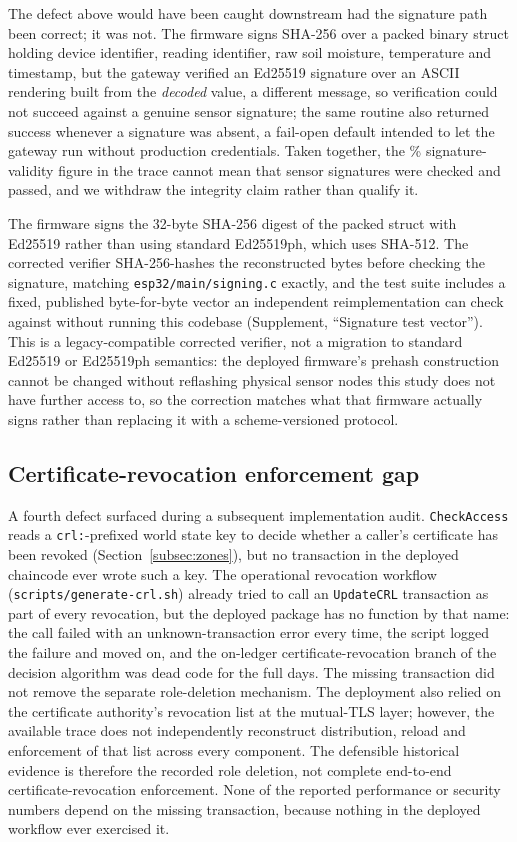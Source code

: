 \documentclass[a4paper,fleqn]{cas-sc}
\begin{document}
The defect above would have been caught downstream had the signature path
been correct; it was not. The firmware signs SHA-256 over a packed binary
struct holding device identifier, reading identifier, raw soil moisture,
temperature and timestamp, but the gateway verified an Ed25519 signature
over an ASCII rendering built from the \emph{decoded} value, a different
message, so verification could not succeed against a genuine sensor
signature; the same routine also returned success whenever a signature
was absent, a fail-open default intended to let the gateway run without
production credentials. Taken together, the \SigValidPct\%
signature-validity figure in the trace cannot mean that sensor signatures
were checked and passed, and we withdraw the integrity claim rather than
qualify it.

The firmware signs the 32-byte SHA-256 digest of the packed struct with
Ed25519 rather than using standard Ed25519ph, which uses SHA-512.
The corrected verifier SHA-256-hashes the reconstructed bytes
before checking the signature, matching \texttt{esp32/main/signing.c}
exactly, and the test suite includes a fixed, published byte-for-byte
vector an independent reimplementation can check against without running
this codebase (Supplement, ``Signature test vector''). This is a
legacy-compatible corrected verifier, not a migration to standard
Ed25519 or Ed25519ph semantics: the deployed firmware's prehash
construction cannot be changed without reflashing physical sensor nodes
this study does not have further access to, so the correction matches
what that firmware actually signs rather than replacing it with a
scheme-versioned protocol.

\subsection{Certificate-revocation enforcement gap}
\label{subsec:pm_crl}

A fourth defect surfaced during a subsequent implementation audit. \texttt{CheckAccess} reads a \texttt{crl:}-prefixed world
state key to decide whether a caller's certificate has been revoked
(Section~\ref{subsec:zones}), but no transaction in the deployed chaincode
ever wrote such a key. The operational revocation workflow
(\texttt{scripts/generate-crl.sh}) already tried to call an
\texttt{UpdateCRL} transaction as part of every revocation, but the
deployed package has no function by that name: the call failed with an
unknown-transaction error every time, the script logged the failure and
moved on, and the on-ledger certificate-revocation branch of the decision
algorithm was dead code for the full \DeployDays{} days. The missing transaction did not remove the separate role-deletion mechanism. The deployment also relied on the certificate authority's revocation list at the mutual-TLS layer; however, the available trace does not independently reconstruct distribution, reload and enforcement of that list across every component. The defensible historical evidence is therefore the recorded role deletion, not complete end-to-end certificate-revocation enforcement. None of the reported performance or
security numbers depend on the missing transaction, because nothing in the
deployed workflow ever exercised it.
\end{document}
